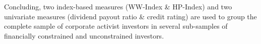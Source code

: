 \documentclass[12pt]{article}
\begin{document}
Concluding, two index-based measures (WW-Index \& HP-Index) and two univariate measures (dividend payout ratio \& credit rating) are used to group the complete sample of corporate activist investors in several sub-samples of financially constrained and unconstrained investors.



\end{document}
